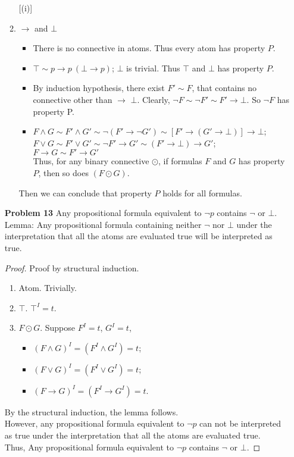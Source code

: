 \begin{enumerate}
\begin{enumerate} [(i)]
          \item $\rightarrow $ and $\bot$ 
            \begin{itemize}
                \item There is no connective in atoms. Thus every atom has property $P$. 
                \item $\top \sim p \rightarrow p \: (\bot \rightarrow p) $; $\bot$ is trivial. Thus $\top$ and $\bot$ has property $P$. 
                \item By induction hypothesis, there exist $F' \sim F$, that contains no connective other than $\rightarrow $  $\bot$.  Clearly, $\neg F \sim \neg F' \sim F' \rightarrow \bot $.  So $\neg F$ has property P. 
                \item $F \wedge G \sim F' \wedge G' \sim \neg ( F' \rightarrow \neg G') \sim [F' \rightarrow (G' \rightarrow \bot)] \rightarrow \bot$; \\
                 $F \vee G \sim F' \vee G' \sim \neg F' \rightarrow G' \sim (F' \rightarrow \bot) \rightarrow G'$;  \\
                 $ F \rightarrow G \sim F' \rightarrow G' $\\
                 Thus, for any binary connective $\odot$, if formulas $F$ and $G$ has property $P$, then so does $(F \odot G)$. 
            \end{itemize}
       Then we can conclude that property $P$ holds for all formulas.    
    \end{enumerate}

\item[\textbf{Problem 13}] Any propositional formula equivalent to $\neg p$ contains $\neg$ or $\bot$.  \\
Lemma: Any propositional formula containing neither $\neg$ nor $\bot$ under the interpretation that all the atoms are evaluated true will be interpreted as true.
\begin{proof} Proof by structural induction. 
\begin{enumerate}[i]
	\item Atom. Trivially.
	\item $\top$. $\top^I = t$.
	\item  $F\odot G$. Suppose	$F^I = t$, $G^I = t$, 
		\begin{itemize}
			\item $(F \wedge G)^I = (F^I \wedge G^I) = t$; \\
			\item $(F \vee G)^I = (F^I \vee G^I) = t$; \\
			\item $(F \rightarrow G)^I = (F^I \rightarrow G^I) = t$. 
		\end{itemize}
\end{enumerate}
By the structural induction, the lemma follows.\\
However, any propositional formula equivalent to $ \neg p$ can not be interpreted as true under the interpretation that all the atoms are evaluated true.\\
Thus, Any propositional formula equivalent to $\neg p$ contains $\neg$ or $\bot$.
\end{proof}


\end{enumerate}
